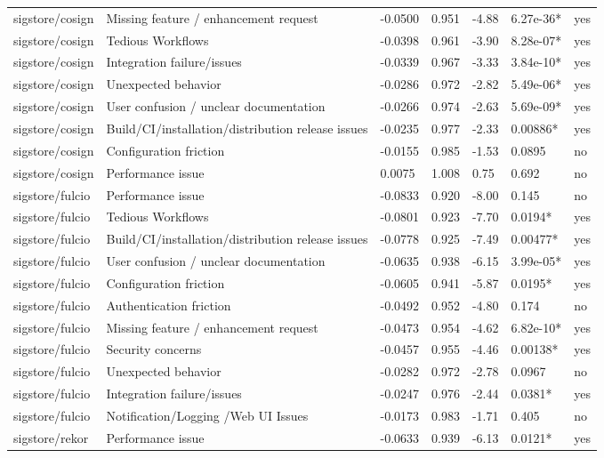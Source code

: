 \begin{table}[t]
\begin{tabular}{lllllll}
sigstore/cosign & Missing feature / enhancement request & -0.0500 & 0.951 & -4.88 & 6.27e-36* & yes \\
sigstore/cosign & Tedious Workflows & -0.0398 & 0.961 & -3.90 & 8.28e-07* & yes \\
sigstore/cosign & Integration failure/issues & -0.0339 & 0.967 & -3.33 & 3.84e-10* & yes \\
sigstore/cosign & Unexpected behavior & -0.0286 & 0.972 & -2.82 & 5.49e-06* & yes \\
sigstore/cosign & User confusion / unclear documentation & -0.0266 & 0.974 & -2.63 & 5.69e-09* & yes \\
sigstore/cosign & Build/CI/installation/distribution release issues & -0.0235 & 0.977 & -2.33 & 0.00886* & yes \\
sigstore/cosign & Configuration friction & -0.0155 & 0.985 & -1.53 & 0.0895 & no \\
sigstore/cosign & Performance issue & 0.0075 & 1.008 & 0.75 & 0.692 & no \\
sigstore/fulcio & Performance issue & -0.0833 & 0.920 & -8.00 & 0.145 & no \\
sigstore/fulcio & Tedious Workflows & -0.0801 & 0.923 & -7.70 & 0.0194* & yes \\
sigstore/fulcio & Build/CI/installation/distribution release issues & -0.0778 & 0.925 & -7.49 & 0.00477* & yes \\
sigstore/fulcio & User confusion / unclear documentation & -0.0635 & 0.938 & -6.15 & 3.99e-05* & yes \\
sigstore/fulcio & Configuration friction & -0.0605 & 0.941 & -5.87 & 0.0195* & yes \\
sigstore/fulcio & Authentication friction & -0.0492 & 0.952 & -4.80 & 0.174 & no \\
sigstore/fulcio & Missing feature / enhancement request & -0.0473 & 0.954 & -4.62 & 6.82e-10* & yes \\
sigstore/fulcio & Security concerns & -0.0457 & 0.955 & -4.46 & 0.00138* & yes \\
sigstore/fulcio & Unexpected behavior & -0.0282 & 0.972 & -2.78 & 0.0967 & no \\
sigstore/fulcio & Integration failure/issues & -0.0247 & 0.976 & -2.44 & 0.0381* & yes \\
sigstore/fulcio & Notification/Logging /Web UI Issues & -0.0173 & 0.983 & -1.71 & 0.405 & no \\
sigstore/rekor & Performance issue & -0.0633 & 0.939 & -6.13 & 0.0121* & yes \\

\end{tabular}
\end{table}
